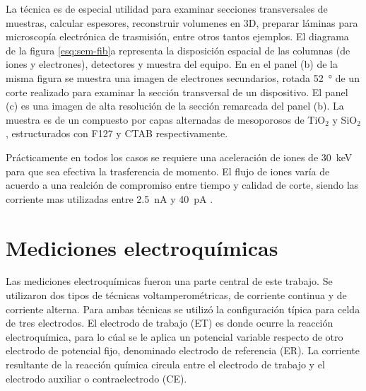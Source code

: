 			

		La técnica es de especial utilidad para examinar secciones transversales de muestras, calcular espesores, reconstruir volumenes en 3D, preparar láminas para microscopía electrónica de trasmisión, entre otros tantos ejemplos. El diagrama de la figura \ref{esq:sem-fib}a representa la disposición espacial de las columnas (de iones y electrones), detectores y muestra del equipo. En en el panel (b) de la misma figura se muestra una imagen de electrones secundarios, rotada \SI{52}{\degree} de un corte realizado para examinar la sección transversal de un dispositivo. El panel (c) es una imagen de alta resolución de la sección remarcada del panel (b). La muestra es de un compuesto por capas alternadas de mesoporosos de TiO$_2$ y SiO$_2$, estructurados con F127 y CTAB respectivamente.\cite{Gimenez2017}

		Prácticamente en todos los casos se requiere una aceleración de iones de \SI{30}{\kilo\electronvolt} para que sea efectiva la trasferencia de momento. El flujo de iones varía de acuerdo a una realción de compromiso entre tiempo y calidad de corte, siendo las corriente mas utilizadas entre \SI{2.5}{\nano\ampere} y \SI{40}{\pico\ampere} \cite{Orloff2003,Reyntjens2001}.

\section{Mediciones electroquímicas}\label{sec:medidas_eq}
		
			Las mediciones electroquímicas fueron una parte central de este trabajo. Se utilizaron dos tipos de técnicas voltamperométricas, de corriente continua y de corriente alterna. 	%
			Para ambas técnicas se utilizó la configuración típica para celda de tres electrodos.\cite{Wi2000} El electrodo de trabajo (ET) es donde ocurre la reacción electroquímica, para lo cúal se le aplica un potencial variable respecto de otro electrodo de potencial fijo, denominado electrodo de referencia (ER). La corriente resultante de la reacción química circula entre el electrodo de trabajo y el electrodo auxiliar o contraelectrodo (CE). 
		
